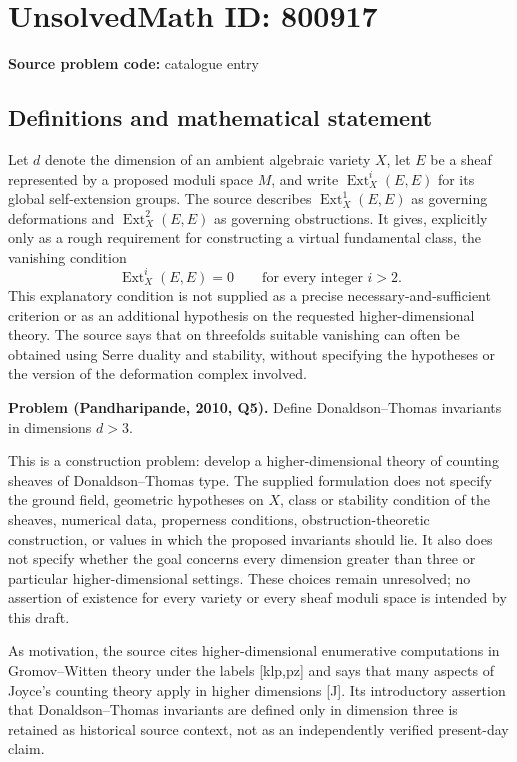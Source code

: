 \documentclass[11pt]{article}
\begin{document}
\section*{UnsolvedMath ID: 800917}
\textbf{Source problem code:} catalogue entry
\subsection{Definitions and mathematical statement}
Let \(d\) denote the dimension of an ambient algebraic variety \(X\), let \(E\) be a sheaf represented by a proposed moduli space \(M\), and write \(\operatorname{Ext}^{i}_{X}(E,E)\) for its global self-extension groups. The source describes \(\operatorname{Ext}^{1}_{X}(E,E)\) as governing deformations and \(\operatorname{Ext}^{2}_{X}(E,E)\) as governing obstructions. It gives, explicitly only as a rough requirement for constructing a virtual fundamental class, the vanishing condition
\[
\operatorname{Ext}^{i}_{X}(E,E)=0\qquad\text{for every integer }i>2.
\]
This explanatory condition is not supplied as a precise necessary-and-sufficient criterion or as an additional hypothesis on the requested higher-dimensional theory. The source says that on threefolds suitable vanishing can often be obtained using Serre duality and stability, without specifying the hypotheses or the version of the deformation complex involved.

\textbf{Problem (Pandharipande, 2010, Q5).} Define Donaldson--Thomas invariants in dimensions \(d>3\).

This is a construction problem: develop a higher-dimensional theory of counting sheaves of Donaldson--Thomas type. The supplied formulation does not specify the ground field, geometric hypotheses on \(X\), class or stability condition of the sheaves, numerical data, properness conditions, obstruction-theoretic construction, or values in which the proposed invariants should lie. It also does not specify whether the goal concerns every dimension greater than three or particular higher-dimensional settings. These choices remain unresolved; no assertion of existence for every variety or every sheaf moduli space is intended by this draft.

As motivation, the source cites higher-dimensional enumerative computations in Gromov--Witten theory under the labels [klp,pz] and says that many aspects of Joyce's counting theory apply in higher dimensions [J]. Its introductory assertion that Donaldson--Thomas invariants are defined only in dimension three is retained as historical source context, not as an independently verified present-day claim.
\end{document}
